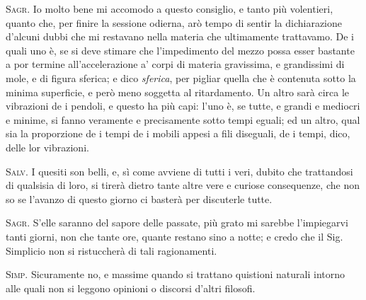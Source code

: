 \documentclass[11pt,twoside,openany]{book}
\newcommand{\speaker}[1]{\textcolor{rubric}{\textsc{#1}}\space}
\begin{document}
\speaker{Sagr.} Io molto bene mi accomodo a questo consiglio, e tanto più volentieri, quanto che, per finire la sessione odierna, arò tempo di sentir la dichiarazione d'alcuni dubbi che mi restavano nella materia che ultimamente trattavamo. De i quali uno è, se si deve stimare che l'impedimento del mezzo possa esser bastante a por termine all'accelerazione a' corpi di materia gravissima, e grandissimi di mole, e di figura sferica; e dico \emph{sferica}, per pigliar quella che è contenuta sotto la minima superficie, e però meno soggetta al ritardamento. Un altro sarà circa le vibrazioni de i pendoli, e questo ha più capi: l'uno è, se tutte, e grandi e mediocri e minime, si fanno veramente e precisamente sotto tempi eguali; ed un altro, qual sia la proporzione de i tempi de i mobili appesi a fili diseguali, de i tempi, dico, delle lor vibrazioni.

\speaker{Salv.} I quesiti son belli, e, sì come avviene di tutti i veri, dubito che trattandosi di qualsisia di loro, si tirerà dietro tante altre vere e curiose consequenze, che non so se l'avanzo di questo giorno ci basterà per discuterle tutte.

\speaker{Sagr.} S'elle saranno del sapore delle passate, più grato mi sarebbe l'impiegarvi tanti giorni, non che tante ore, quante restano sino a notte; e credo che il Sig. Simplicio non si ristuccherà di tali ragionamenti.

\speaker{Simp.} Sicuramente no, e massime quando si trattano quistioni naturali intorno alle quali non si leggono opinioni o discorsi d'altri filosofi.
\end{document}
